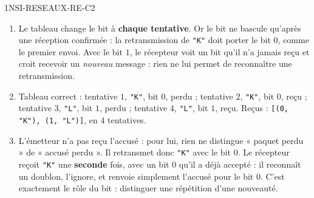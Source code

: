 \begin{corrige}{1NSI-RESEAUX-RE-C2}
\begin{enumerate}
  \item Le tableau change le bit à \textbf{chaque tentative}. Or le bit ne bascule
        qu'après une réception confirmée : la retransmission de \lstinline{"K"} doit porter
        le bit $0$, comme le premier envoi. Avec le bit $1$, le récepteur voit un bit qu'il
        n'a jamais reçu et croit recevoir un \emph{nouveau} message : rien ne lui permet de
        reconnaître une retransmission.
  \item Tableau correct : tentative $1$, \lstinline{"K"}, bit $0$, perdu ; tentative $2$,
        \lstinline{"K"}, bit $0$, reçu ; tentative $3$, \lstinline{"L"}, bit $1$, perdu ;
        tentative $4$, \lstinline{"L"}, bit $1$, reçu. Reçus :
        \lstinline{[(0, "K"), (1, "L")]}, en $4$ tentatives.
  \item L'émetteur n'a pas reçu l'accusé : pour lui, rien ne distingue « paquet perdu » de
        « accusé perdu ». Il retransmet donc \lstinline{"K"} avec le bit $0$. Le récepteur
        reçoit \lstinline{"K"} une \textbf{seconde} fois, avec un bit $0$ qu'il a déjà
        accepté : il reconnaît un doublon, l'ignore, et renvoie simplement l'accusé pour le
        bit $0$. C'est exactement le rôle du bit : distinguer une répétition d'une nouveauté.
\end{enumerate}
\end{corrige}
